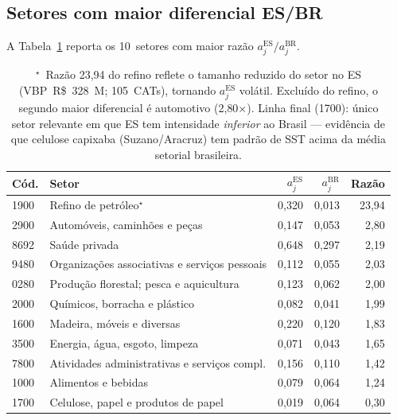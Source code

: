\documentclass[12pt, a4paper]{article}
\begin{document}
\subsection{Setores com maior diferencial ES/BR}

A Tabela~\ref{tab:bres_setores} reporta os 10~setores com maior
razão $a_j^{\text{ES}}/a_j^{\text{BR}}$.

\begin{table}[H]
\centering
\small
\caption{Setores com maior intensidade relativa $a_j^{\text{ES}}/a_j^{\text{BR}}$ (CATs/R\$~M), 2015}
\label{tab:bres_setores}
\begin{tabular}{lp{5.0cm}rrr}
\toprule
\textbf{Cód.} & \textbf{Setor} & $a_j^{\text{ES}}$ & $a_j^{\text{BR}}$ & \textbf{Razão} \\
\midrule
1900 & Refino de petróleo$^{\star}$ & 0{,}320 & 0{,}013 & 23{,}94 \\
2900 & Automóveis, caminhões e peças & 0{,}147 & 0{,}053 & 2{,}80 \\
8692 & Saúde privada & 0{,}648 & 0{,}297 & 2{,}19 \\
9480 & Organizações associativas e serviços pessoais & 0{,}112 & 0{,}055 & 2{,}03 \\
0280 & Produção florestal; pesca e aquicultura & 0{,}123 & 0{,}062 & 2{,}00 \\
2000 & Químicos, borracha e plástico & 0{,}082 & 0{,}041 & 1{,}99 \\
1600 & Madeira, móveis e diversas & 0{,}220 & 0{,}120 & 1{,}83 \\
3500 & Energia, água, esgoto, limpeza & 0{,}071 & 0{,}043 & 1{,}65 \\
7800 & Atividades administrativas e serviços compl. & 0{,}156 & 0{,}110 & 1{,}42 \\
1000 & Alimentos e bebidas & 0{,}079 & 0{,}064 & 1{,}24 \\
\midrule
1700 & Celulose, papel e produtos de papel & 0{,}019 & 0{,}064 & 0{,}30 \\
\bottomrule
\end{tabular}
\caption*{\footnotesize $^{\star}$~Razão 23{,}94 do refino reflete o
tamanho reduzido do setor no ES (VBP~R\$~328~M; 105~CATs), tornando
$a_j^{\text{ES}}$ volátil. Excluído do refino, o segundo maior diferencial
é automotivo (2{,}80×). Linha final (1700): único setor relevante em que
ES tem intensidade \textit{inferior} ao Brasil --- evidência de que
celulose capixaba (Suzano/Aracruz) tem padrão de SST acima da média
setorial brasileira.}
\end{table}
\end{document}
